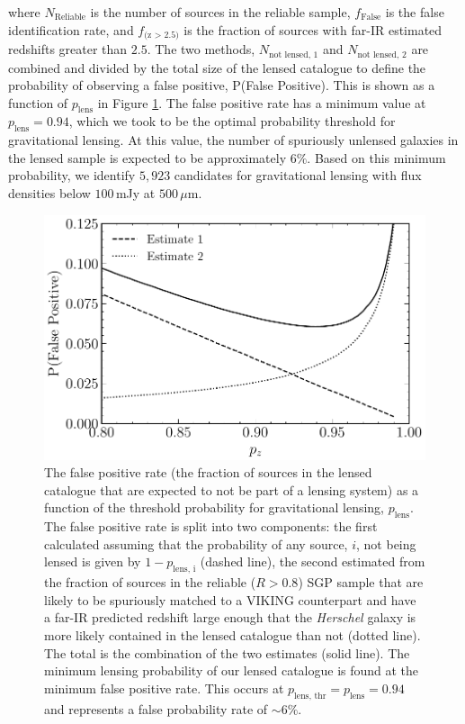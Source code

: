 \noindent where $N_{\textrm{Reliable}}$ is the number of sources in the reliable sample, $f_{\textrm{False}}$ is the false identification rate, and $f_{\textrm{(z > 2.5)}}$ is the fraction of sources with far-IR estimated redshifts greater than $2.5$. The two methods, $N_{\textrm{not lensed, 1}}$ and $N_{\textrm{not lensed, 2}}$ are combined and divided by the total size of the lensed catalogue to define the probability of observing a false positive, P(False Positive). This is shown as a function of $p_{\textrm{lens}}$ in Figure \ref{fig:lens_false_positive}. The false positive rate has a minimum value at $p_\textrm{lens} = 0.94$, which we took to be the optimal probability threshold for gravitational lensing. At this value, the number of spuriously unlensed galaxies in the lensed sample is expected to be approximately $6\%$. Based on this minimum probability, we identify $5,923$ candidates for gravitational lensing with flux densities below $100\,$mJy at $500\,\mu$m.

\begin{figure}
    \centering
    \includegraphics[width=0.75\columnwidth]{Figures/lens_false_positive.pdf}
    \caption[Fraction of unlensed sources in our lensed sample as a function of $p_\textrm{lens}$]{The false positive rate (the fraction of sources in the lensed catalogue that are expected to not be part of a lensing system) as a function of the threshold probability for gravitational lensing, $p_\textrm{lens}$. The false positive rate is split into two components: the first calculated assuming that the probability of any source, $i$, not being lensed is given by $1 - p_{\textrm{lens, i}}$ (dashed line), the second estimated from the fraction of sources in the reliable ($R > 0.8$) SGP sample that are likely to be spuriously matched to a VIKING counterpart and have a far-IR predicted redshift large enough that the \textit{Herschel} galaxy is more likely contained in the lensed catalogue than not (dotted line). The total is the combination of the two estimates (solid line). The minimum lensing probability of our lensed catalogue is found at the minimum false positive rate. This occurs at $p_\textrm{lens, thr} = p_\textrm{lens} = 0.94$ and represents a false probability rate of $\sim 6\%$.}
    \label{fig:lens_false_positive}
\end{figure}

